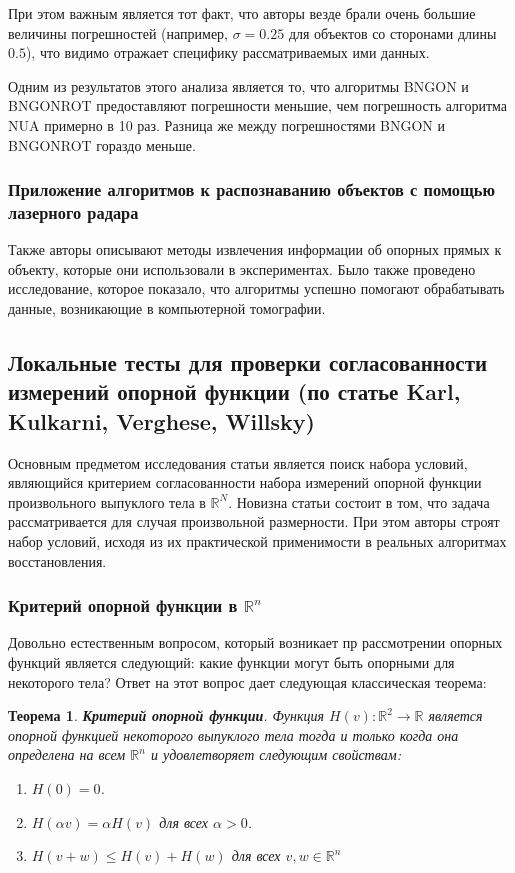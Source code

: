 \documentclass[a4paper, 12pt, titlepage]{article}
\theoremstyle{definition}
\theoremstyle{plain}
\newtheorem{SmartTheorem}{Теорема}
\theoremstyle{plain}
\begin{document}
При этом важным является тот факт, что авторы везде брали очень большие
величины погрешностей (например, $\sigma = 0.25$ для объектов со сторонами 
длины $0.5$), что видимо отражает специфику рассматриваемых ими данных.

Одним из результатов этого анализа является то, что алгоритмы BNGON и BNGONROT
предоставляют погрешности меньшие, чем погрешность алгоритма NUA примерно в 10
раз. Разница же между погрешностями BNGON и BNGONROT гораздо меньше.

\subsubsection{Приложение алгоритмов к распознаванию объектов с помощью
лазерного радара}
\label{sec:history/LeleKW92/applications}

Также авторы описывают методы извлечения информации об опорных прямых к
объекту, которые они использовали в экспериментах. Было также проведено
исследование, которое показало, что алгоритмы успешно помогают обрабатывать
данные, возникающие в компьютерной томографии.

\newpage
\subsection{Локальные тесты для проверки согласованности измерений опорной
функции (по статье Karl, Kulkarni, Verghese, Willsky)}
\label{sec:history/KarlKVW96}

Основным предметом исследования статьи является поиск набора условий,
являющийся критерием согласованности набора измерений опорной функции 
произвольного выпуклого тела в $\mathbb{R}^{N}$. Новизна статьи состоит в
том, что задача рассматривается для случая произвольной размерности. При этом
авторы строят набор условий, исходя из их практической применимости в реальных
алгоритмах восстановления.

\subsubsection{Критерий опорной функции в $\mathbb{R}^{n}$}
\label{sec:history/KarlKVW96/support-function-criterion}

Довольно естественным вопросом, который возникает пр рассмотрении опорных
функций является следующий: какие функции могут быть опорными для некоторого
тела? Ответ на этот вопрос дает следующая классическая теорема:

\begin{SmartTheorem}
 \label{thm:support-function-criterio-R2}
 \textbf{Критерий опорной функции}.
 Функция $H(v): \mathbb{R}^{2} \to \mathbb{R}$ является опорной функцией
 некоторого выпуклого тела тогда и только когда она определена на всем
 $\mathbb{R}^{n}$ и удовлетворяет следующим свойствам:
 \begin{enumerate}
  \item $H(0) = 0$.
  \item $H(\alpha v) = \alpha H(v)$ для всех $\alpha > 0$.
  \item $H(v + w) \leq H(v) + H(w)$ для всех $v, w \in \mathbb{R}^{n}$
 \end{enumerate}
\end{SmartTheorem}
\end{document}
